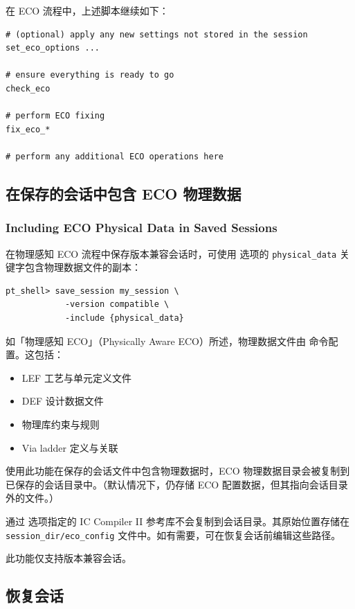 在 ECO 流程中，上述脚本继续如下：
\begin{lstlisting}
# (optional) apply any new settings not stored in the session
set_eco_options ...

# ensure everything is ready to go
check_eco

# perform ECO fixing
fix_eco_*

# perform any additional ECO operations here
\end{lstlisting}

\subsection{在保存的会话中包含 ECO 物理数据}
\subsubsection*{Including ECO Physical Data in Saved Sessions}

在物理感知 ECO 流程中保存版本兼容会话时，可使用  选项的 \texttt{physical\_data} 关键字包含物理数据文件的副本：
\begin{lstlisting}
pt_shell> save_session my_session \
            -version compatible \
            -include {physical_data}
\end{lstlisting}

如「物理感知 ECO」（Physically Aware ECO）所述，物理数据文件由  命令配置。这包括：
\begin{itemize}
  \item LEF 工艺与单元定义文件
  \item DEF 设计数据文件
  \item 物理库约束与规则
  \item Via ladder 定义与关联
\end{itemize}

使用此功能在保存的会话文件中包含物理数据时，ECO 物理数据目录会被复制到已保存的会话目录中。（默认情况下，仍存储 ECO 配置数据，但其指向会话目录外的文件。）

\begin{noteBox}
通过  选项指定的 IC Compiler II 参考库不会复制到会话目录。其原始位置存储在 \texttt{session\_dir/eco\_config} 文件中。如有需要，可在恢复会话前编辑这些路径。
\end{noteBox}

此功能仅支持版本兼容会话。

\subsection{恢复会话}
